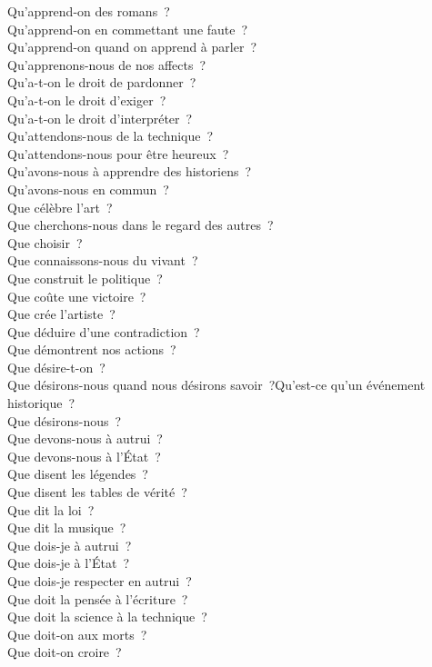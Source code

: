 \documentclass[a4paper,12pt]{article}
\begin{document}
Qu'apprend-on des romans ? \\
Qu'apprend-on en commettant une faute ? \\
Qu'apprend-on quand on apprend à parler ? \\
Qu'apprenons-nous de nos affects ? \\
Qu'a-t-on le droit de pardonner ? \\
Qu'a-t-on le droit d'exiger ? \\
Qu'a-t-on le droit d'interpréter ? \\
Qu'attendons-nous de la technique ? \\
Qu'attendons-nous pour être heureux ? \\
Qu'avons-nous à apprendre des historiens ? \\
Qu'avons-nous en commun ? \\
Que célèbre l'art ? \\
Que cherchons-nous dans le regard des autres ? \\
Que choisir ? \\
Que connaissons-nous du vivant ? \\
Que construit le politique ? \\
Que coûte une victoire ? \\
Que crée l'artiste ? \\
Que déduire d'une contradiction ? \\
Que démontrent nos actions ? \\
Que désire-t-on ? \\
Que désirons-nous quand nous désirons savoir ?Qu'est-ce qu'un événement historique ? \\
Que désirons-nous ? \\
Que devons-nous à autrui ? \\
Que devons-nous à l'État ? \\
Que disent les légendes ? \\
Que disent les tables de vérité ? \\
Que dit la loi ? \\
Que dit la musique ? \\
Que dois-je à autrui ? \\
Que dois-je à l'État ? \\
Que dois-je respecter en autrui ? \\
Que doit la pensée à l'écriture ? \\
Que doit la science à la technique ? \\
Que doit-on aux morts ? \\
Que doit-on croire ? \\
\end{document}
